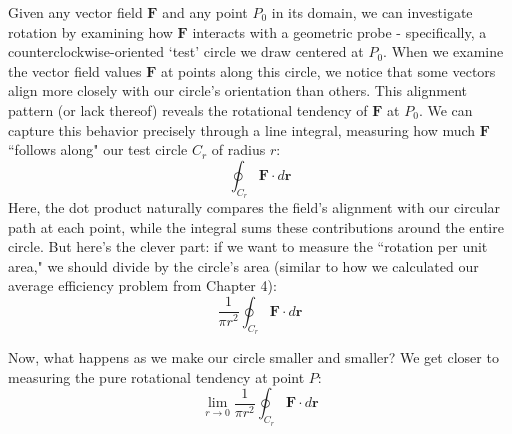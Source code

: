 \noindent Given any vector field $\mathbf{F}$ and any point $P_0$ in its domain, we can investigate rotation by examining how $\mathbf{F}$ interacts with a geometric probe - specifically, a counterclockwise-oriented `test' circle we draw centered at $P_0$. When we examine the vector field values $\mathbf{F}$ at points along this circle, we notice that some vectors align more closely with our circle's orientation than others. This alignment pattern (or lack thereof) reveals the rotational tendency of $\mathbf{F}$ at $P_0$. We can capture this behavior precisely through a line integral, measuring how much $\mathbf{F}$ ``follows along" our test circle $C_r$ of radius $r$:
\[
\oint_{C_r} \mathbf{F} \cdot d\mathbf{r}
\]
Here, the dot product naturally compares the field's alignment with our circular path at each point, while the integral sums these contributions around the entire circle. But here's the clever part: if we want to measure the ``rotation per unit area," we should divide by the circle's area (similar to how we calculated our average efficiency problem from Chapter 4):
\[
\frac{1}{\pi r^2} \oint_{C_r} \mathbf{F} \cdot d\mathbf{r}
\]

\noindent Now, what happens as we make our circle smaller and smaller? We get closer to measuring the pure rotational tendency at point $P$:
\[
\lim_{r \to 0} \frac{1}{\pi r^2} \oint_{C_r} \mathbf{F} \cdot d\mathbf{r}
\]

